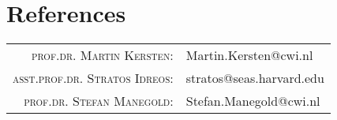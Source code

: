 \documentclass[a4paper,10pt]{article}
\begin{document}
\section{References}
\begin{tabular}{rl}
\textsc{prof.dr. Martin  Kersten}:& Martin.Kersten@cwi.nl\\
\textsc{asst.prof.dr. Stratos Idreos}:& stratos@seas.harvard.edu\\
\textsc{prof.dr. Stefan Manegold}:& Stefan.Manegold@cwi.nl\\
\end{tabular}


\end{document}
